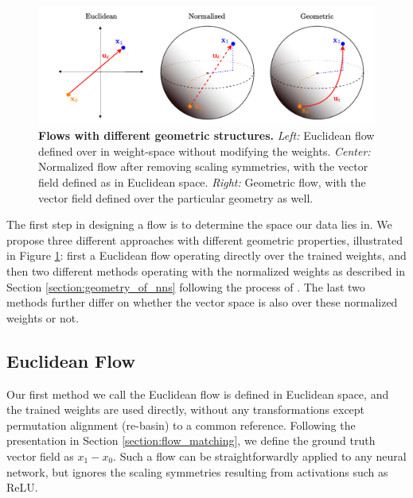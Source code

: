 \begin{figure}[h!]
    \centering
    \includegraphics[width=\textwidth]{figures/flow_types.drawio.pdf}
    \caption{\label{fig:flow_types}\textbf{Flows with different geometric structures.} \textit{Left:} Euclidean flow defined over in weight-space without modifying the weights. \textit{Center:} Normalized flow after removing scaling symmetries, with the vector field defined as in Euclidean space. \textit{Right:} Geometric flow, with the vector field defined over the particular geometry as well.}
\end{figure}

The first step in designing a flow is to determine the space our data lies in. We propose three different approaches with different geometric properties, illustrated in Figure \ref{fig:flow_types}: first a Euclidean flow operating directly over the trained weights, and then two different methods operating with the normalized weights as described in Section \ref{section:geometry_of_nns} following the process of \citep{pittorinoDeepNetworksToroids2022}. The last two methods further differ on whether the vector space is also over these normalized weights or not. 

\subsection{Euclidean Flow}

Our first method we call the Euclidean flow is defined in Euclidean space, and the trained weights are used directly, without any transformations except permutation alignment (re-basin) to a common reference. Following the presentation in Section \ref{section:flow_matching}, we define the ground truth vector field as $x_1 - x_0$. Such a flow can be straightforwardly applied to any neural network, but ignores the scaling symmetries resulting from activations such as ReLU. 

